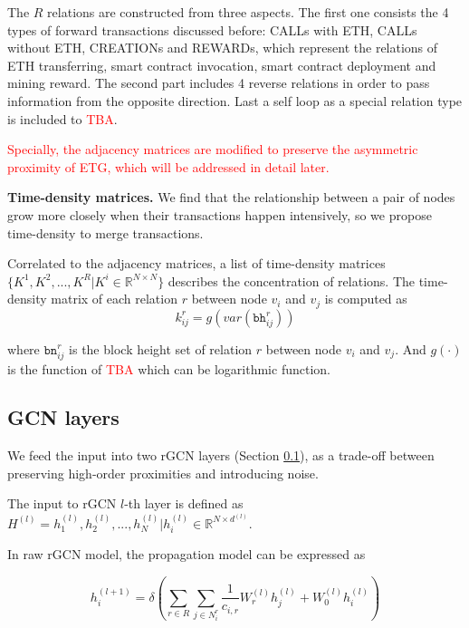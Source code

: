 The $R$ relations are constructed from three aspects. The first one consists the 4 types of forward transactions discussed before: CALLs with ETH, CALLs without ETH, CREATIONs and REWARDs, which represent the relations of ETH transferring, smart contract invocation, smart contract deployment and mining reward. The second part includes 4 reverse relations in order to pass information from the opposite direction. Last a self loop as a special relation type is included to \textcolor{red}{TBA}.

\textcolor{red}{Specially, the adjacency matrices are modified to preserve the asymmetric proximity of ETG, which will be addressed in detail later.}




\textbf{Time-density matrices.} We find that the relationship between a pair of nodes grow more closely when their transactions happen intensively, so we propose time-density to merge transactions.

 Correlated to the adjacency matrices, a list of time-density matrices $\{K^1,K^2,...,K^R|K^i\in \mathbb{R}^{N \times N}\}$ describes the concentration of relations. The time-density matrix of each relation $r$ between node $v_i$ and $v_j$ is computed as%
\begin{equation}
k_{ij}^r=g(var(\texttt{bh}_{ij}^r))
\label{eq:time}
\end{equation}

where $\texttt{bn}_{ij}^{r}$ is the block height set of relation $r$ between node $v_i$ and $v_j$. And $g(\cdot)$ is the function of \textcolor{red}{TBA} which can be logarithmic function.


\subsection{GCN layers}
\label{sec:rGCN layers}
 We feed the input into two rGCN layers (Section \ref{sec:rGCN layers}), as a trade-off between preserving high-order proximities and introducing noise.

The input to rGCN $l$-th layer is defined as $H^{(l)}={h_1^{(l)},h_2^{(l)},...,h_N^{(l)}|h_i^{(l)}\in \mathbb{R}^{N \times d^{(l)}}}$.

In raw rGCN model, the propagation model can be expressed as

\begin{equation}
h_i^{(l+1)}=\delta(\sum_{r\in R} \sum_{j \in N_i^r} \frac{1}{c_{i,r}}W_r^{(l)}h_j^{(l)}+W_0^{(l)}h_i^{(l)})
\label{eq:rgcn}
\end{equation}


